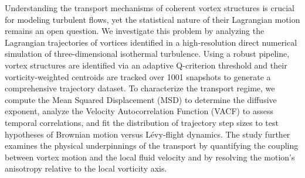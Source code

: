\documentclass[]{article}
\begin{document}
Understanding the transport mechanisms of coherent vortex structures is crucial for modeling turbulent flows, yet the statistical nature of their Lagrangian motion remains an open question. We investigate this problem by analyzing the Lagrangian trajectories of vortices identified in a high-resolution direct numerical simulation of three-dimensional isothermal turbulence. Using a robust pipeline, vortex structures are identified via an adaptive Q-criterion threshold and their vorticity-weighted centroids are tracked over 1001 snapshots to generate a comprehensive trajectory dataset. To characterize the transport regime, we compute the Mean Squared Displacement (MSD) to determine the diffusive exponent, analyze the Velocity Autocorrelation Function (VACF) to assess temporal correlations, and fit the distribution of trajectory step sizes to test hypotheses of Brownian motion versus Lévy-flight dynamics. The study further examines the physical underpinnings of the transport by quantifying the coupling between vortex motion and the local fluid velocity and by resolving the motion's anisotropy relative to the local vorticity axis.
\end{document}

